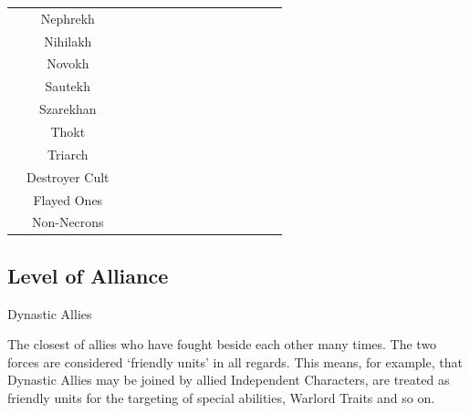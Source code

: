 \begin{tabular}{||c c c c c c c c c c c c c c c||}
	& Nephrekh & \blackskull & \greyskull & \greyskull & & \blackskull & \blackskull & \blackskull & \blackskull & \blackskull & \blackskull & \greyskull & \redskull & \redskull \\
	& Nihilakh & \blackskull & \redskull & \greyskull & \blackskull & & \greyskull & \blackskull & \yellowskull & \blackskull & \blackskull & \greyskull & \redskull & \redskull \\
	& Novokh & \blackskull & \blackskull & \blackskull & \blackskull & \greyskull & & \blackskull & \blackskull & \blackskull & \yellowskull & \yellowskull & \redskull & \redskull \\
	& Sautekh & \blackskull & \greyskull & \redskull & \blackskull & \blackskull & \blackskull & & \redskull & \greyskull & \greyskull & \greyskull & \redskull & \redskull \\
	& Szarekhan & \redskull & \blackskull & \yellowskull & \blackskull & \yellowskull & \blackskull & \redskull & & \yellowskull & \yellowskull & \greyskull & \redskull & \redskull \\
	& Thokt & \blackskull & \greyskull & \blackskull & \blackskull & \blackskull & \blackskull & \greyskull & \yellowskull & & \yellowskull & \greyskull & \redskull & \redskull \\
	& Triarch & \blackskull & \blackskull & \blackskull & \blackskull & \yellowskull & \blackskull & \greyskull & \yellowskull & \yellowskull & & \greyskull & \redskull & \redskull \\
	& Destroyer Cult & \greyskull & \blackskull & \greyskull & \greyskull & \greyskull & \yellowskull & \greyskull & \greyskull & \greyskull & \greyskull & & \greyskull & \redskull \\
	& Flayed Ones & \redskull & \blackskull & \redskull & \redskull & \redskull & \redskull & \redskull & \redskull & \redskull & \redskull & \greyskull & & \redskull \\
	& Non-Necrons & \redskull & \redskull & \redskull & \redskull & \redskull & \redskull & \redskull & \redskull & \redskull & \redskull & \redskull & \redskull & \\
	\hline
\end{tabular}

\subsection{Level of Alliance}

\noindent
\yellowskull Dynastic Allies

The closest of allies who have fought beside each other many times. The two forces are considered ‘friendly units’ in all regards. This means, for example, that Dynastic Allies may be joined by allied Independent Characters, are treated as friendly units for the targeting of special abilities, Warlord Traits and so on.

